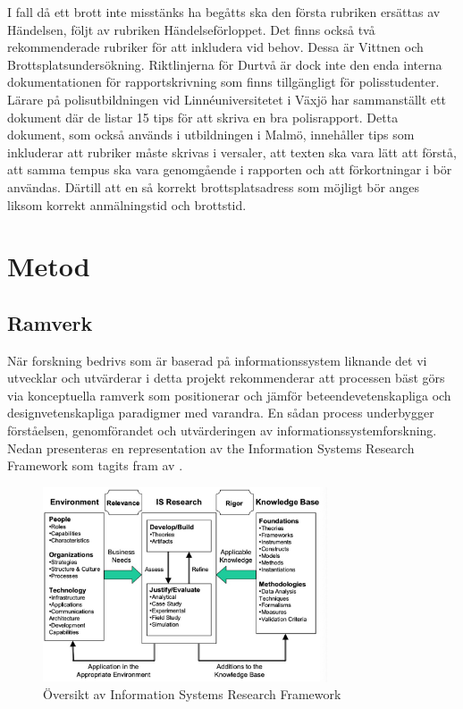\documentclass[swedish]{maucsthesis}
\begin{document}
I fall då ett brott inte misstänks ha begåtts ska den första rubriken ersättas
av Händelsen, följt av rubriken Händelseförloppet. Det finns också två
rekommenderade rubriker för att inkludera vid behov. Dessa är Vittnen och
Brottsplatsundersökning. Riktlinjerna för Durtvå är dock inte den enda interna
dokumentationen för rapportskrivning som finns tillgängligt för polisstudenter.
Lärare på polisutbildningen vid Linnéuniversitetet i Växjö har sammanställt ett
dokument där de listar 15 tips för att skriva en bra polisrapport. Detta
dokument, som också används i utbildningen i Malmö, innehåller tips som
inkluderar att rubriker måste skrivas i versaler, att texten ska vara lätt att
förstå, att samma tempus ska vara genomgående i rapporten och att förkortningar
i bör användas. Därtill att en så korrekt brottsplatsadress som möjligt bör
anges liksom korrekt anmälningstid och brottstid.

\section{Metod}

\subsection{Ramverk}

När forskning bedrivs som är baserad på informationssystem liknande det vi
utvecklar och utvärderar i detta projekt rekommenderar \cite{hevner:2004} att
processen bäst görs via konceptuella ramverk som positionerar och jämför
beteendevetenskapliga och designvetenskapliga paradigmer med varandra. En sådan
process underbygger förståelsen, genomförandet och utvärderingen av
informationssystemforskning. Nedan presenteras en representation av the
Information Systems Research Framework som tagits fram av
\citeauthor{hevner:2004}.

\begin{figure}[H]
    \centering
    \includegraphics[width=0.75\textwidth]{isframework}
    \caption{Översikt av Information Systems Research Framework}
    \label{fig:isframework}
\end{figure}
\end{document}
